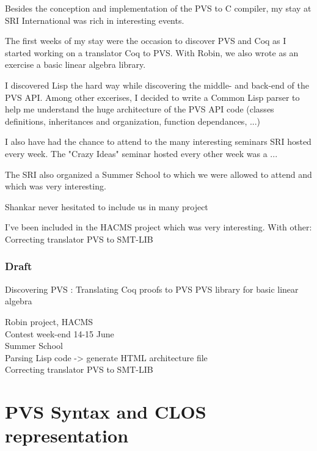 \documentclass[12pt,a4paper]{article}
\begin{document}
Besides the conception and implementation of the PVS to C compiler, my stay at SRI International was rich in interesting events.

The first weeks of my stay were the occasion to discover PVS and Coq as I started working on a translator Coq to PVS. With Robin, we also wrote as an exercise a basic linear algebra library.

I discovered Lisp the hard way while discovering the middle- and back-end of the PVS API. Among other excerises, I decided to write a Common Lisp parser to help me understand the huge architecture of the PVS API code (classes definitions, inheritances and organization, function dependances, ...)

I also have had the chance to attend to the many interesting seminars SRI hosted every week. The "Crazy Ideas" seminar hosted every other week was a ...

The SRI also organized a Summer School to which we were allowed to attend and which was very interesting.

Shankar never hesitated to include us in many project

I've been included in the HACMS project which was very interesting.
With other:
Correcting translator PVS to SMT-LIB




\subsubsection*{Draft}
Discovering PVS :
Translating Coq proofs to PVS
PVS library for basic linear algebra

Robin project, HACMS \\
Contest week-end 14-15 June \\
Summer School \\
Parsing Lisp code -> generate HTML architecture file\\
Correcting translator PVS to SMT-LIB
\cite{pavol}





% 
% 



\printbibliography

\appendix

\newpage
\section{PVS Syntax and CLOS representation}
\end{document}
